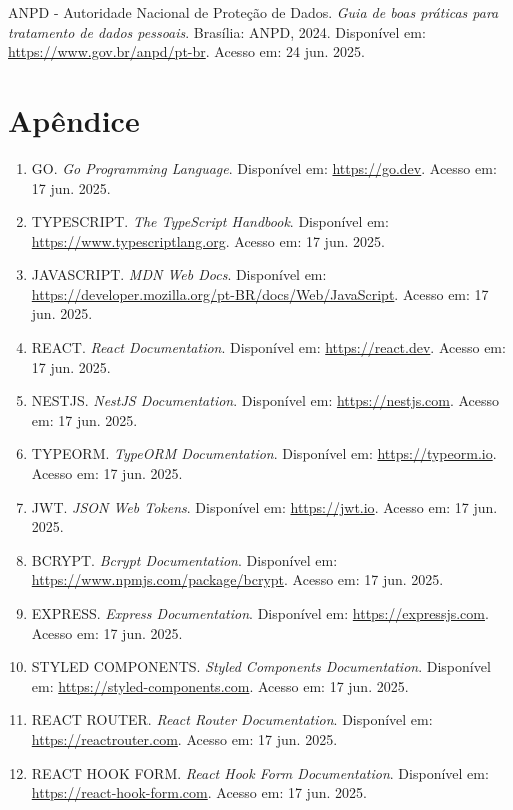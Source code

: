 \documentclass[12pt, a4paper]{article}
\begin{document}
\begin{spacing}{1.5}
\begin{spacing}{1.5}
\begin{spacing}{1.5}
\begin{thebibliography}{99}
ANPD - Autoridade Nacional de Proteção de Dados. \textit{Guia de boas práticas para tratamento de dados pessoais}. Brasília: ANPD, 2024. Disponível em: \url{https://www.gov.br/anpd/pt-br}. Acesso em: 24 jun. 2025.

\end{thebibliography}

\appendix
\section{Apêndice} %

\begin{enumerate}

    \item GO. \textit{Go Programming Language}. Disponível em: \url{https://go.dev}. Acesso em: 17 jun. 2025.
    \item TYPESCRIPT. \textit{The TypeScript Handbook}. Disponível em: \url{https://www.typescriptlang.org}. Acesso em: 17 jun. 2025.
    \item JAVASCRIPT. \textit{MDN Web Docs}. Disponível em: \url{https://developer.mozilla.org/pt-BR/docs/Web/JavaScript}. Acesso em: 17 jun. 2025.
    \item REACT. \textit{React Documentation}. Disponível em: \url{https://react.dev}. Acesso em: 17 jun. 2025.
    \item NESTJS. \textit{NestJS Documentation}. Disponível em: \url{https://nestjs.com}. Acesso em: 17 jun. 2025.
    \item TYPEORM. \textit{TypeORM Documentation}. Disponível em: \url{https://typeorm.io}. Acesso em: 17 jun. 2025.
    \item JWT. \textit{JSON Web Tokens}. Disponível em: \url{https://jwt.io}. Acesso em: 17 jun. 2025.
    \item BCRYPT. \textit{Bcrypt Documentation}. Disponível em: \url{https://www.npmjs.com/package/bcrypt}. Acesso em: 17 jun. 2025.
    \item EXPRESS. \textit{Express Documentation}. Disponível em: \url{https://expressjs.com}. Acesso em: 17 jun. 2025.
    \item STYLED COMPONENTS. \textit{Styled Components Documentation}. Disponível em: \url{https://styled-components.com}. Acesso em: 17 jun. 2025.
    \item REACT ROUTER. \textit{React Router Documentation}. Disponível em: \url{https://reactrouter.com}. Acesso em: 17 jun. 2025.
    \item REACT HOOK FORM. \textit{React Hook Form Documentation}. Disponível em: \url{https://react-hook-form.com}. Acesso em: 17 jun. 2025.

\end{enumerate}
\end{spacing}
\end{spacing}
\end{spacing}
\end{document}
